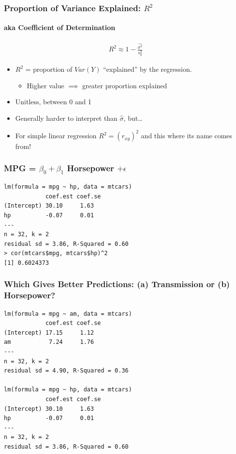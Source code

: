 \documentclass{beamer}
\begin{document}
\begin{frame}
\frametitle{Proportion of Variance Explained: $R^2$}
\framesubtitle{aka Coefficient of Determination}
	\begin{eqnarray*}
		R^2 \approx 1 - \frac{\widehat{\sigma^2}}{s_y^2}
	\end{eqnarray*}
		\begin{itemize}
			\item $R^2$ = proportion of $Var(Y)$ 
        ``explained'' by the regression.
			\begin{itemize}
			\item Higher value $\implies$ greater proportion explained 
			\end{itemize}
			\item Unitless, between 0 and 1 
      \item Generally harder to interpret than $\widehat{\sigma}$, but\dots 
			\item \alert{For simple linear regression $R^2 = (r_{xy})^2$ and this where its name comes from!}
		\end{itemize}
\end{frame}



\begin{frame}[fragile]
\frametitle{MPG = $\beta_0 + \beta_1$ Horsepower $+ \epsilon$}
\footnotesize
\begin{verbatim}
lm(formula = mpg ~ hp, data = mtcars)
            coef.est coef.se
(Intercept) 30.10     1.63  
hp          -0.07     0.01  
---
n = 32, k = 2
residual sd = 3.86, R-Squared = 0.60
> cor(mtcars$mpg, mtcars$hp)^2
[1] 0.6024373
\end{verbatim}
\end{frame}


\begin{frame}[fragile]
\frametitle{Which Gives Better Predictions: (a) Transmission or (b) Horsepower?}
\footnotesize
\begin{verbatim}
lm(formula = mpg ~ am, data = mtcars)
            coef.est coef.se
(Intercept) 17.15     1.12  
am           7.24     1.76  
---
n = 32, k = 2
residual sd = 4.90, R-Squared = 0.36

lm(formula = mpg ~ hp, data = mtcars)
            coef.est coef.se
(Intercept) 30.10     1.63  
hp          -0.07     0.01  
---
n = 32, k = 2
residual sd = 3.86, R-Squared = 0.60
\end{verbatim}

\end{frame}
\end{document}
